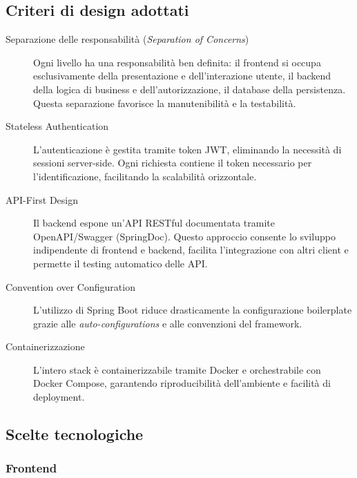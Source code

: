 \subsection{Criteri di design adottati}

\begin{description}
    \item[Separazione delle responsabilità (\emph{Separation of Concerns})]
    Ogni livello ha una responsabilità ben definita: il frontend si occupa
    esclusivamente della presentazione e dell'interazione utente, il backend
    della logica di business e dell'autorizzazione, il database della
    persistenza. Questa separazione favorisce la manutenibilità e la
    testabilità.

    \item[Stateless Authentication]
    L'autenticazione è gestita tramite token JWT, eliminando la necessità
    di sessioni server-side. Ogni richiesta contiene il token necessario
    per l'identificazione, facilitando la scalabilità orizzontale.

    \item[API-First Design]
    Il backend espone un'API RESTful documentata tramite OpenAPI/Swagger
    (SpringDoc). Questo approccio consente lo sviluppo indipendente di
    frontend e backend, facilita l'integrazione con altri client e permette
    il testing automatico delle API.

    \item[Convention over Configuration]
    L'utilizzo di Spring Boot riduce drasticamente la configurazione
    boilerplate grazie alle \emph{auto-configurations} e alle convenzioni
    del framework.

    \item[Containerizzazione]
    L'intero stack è containerizzabile tramite Docker e orchestrabile con
    Docker Compose, garantendo riproducibilità dell'ambiente e facilità di
    deployment.
\end{description}

\subsection{Scelte tecnologiche}

\subsubsection{Frontend}

